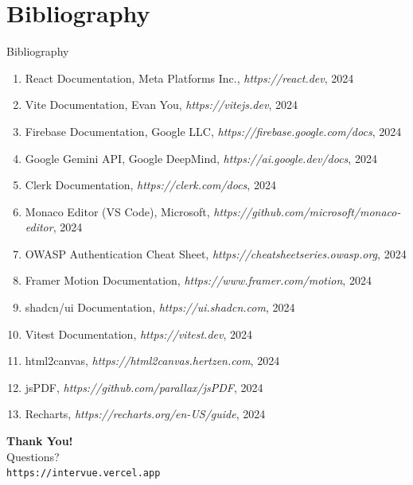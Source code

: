 \documentclass{beamer}
\begin{document}
\section{Bibliography}
\begin{frame}{Bibliography}
\footnotesize
\begin{enumerate}
    \item React Documentation, Meta Platforms Inc., \textit{https://react.dev}, 2024
    \item Vite Documentation, Evan You, \textit{https://vitejs.dev}, 2024
    \item Firebase Documentation, Google LLC, \textit{https://firebase.google.com/docs}, 2024
    \item Google Gemini API, Google DeepMind, \textit{https://ai.google.dev/docs}, 2024
    \item Clerk Documentation, \textit{https://clerk.com/docs}, 2024
    \item Monaco Editor (VS Code), Microsoft, \textit{https://github.com/microsoft/monaco-editor}, 2024
    \item OWASP Authentication Cheat Sheet, \textit{https://cheatsheetseries.owasp.org}, 2024
    \item Framer Motion Documentation, \textit{https://www.framer.com/motion}, 2024
    \item shadcn/ui Documentation, \textit{https://ui.shadcn.com}, 2024
    \item Vitest Documentation, \textit{https://vitest.dev}, 2024
    \item html2canvas, \textit{https://html2canvas.hertzen.com}, 2024
    \item jsPDF, \textit{https://github.com/parallax/jsPDF}, 2024
    \item Recharts, \textit{https://recharts.org/en-US/guide}, 2024
\end{enumerate}
\end{frame}

\begin{frame}
\begin{center}
\Huge \textbf{Thank You!}\\
\vspace{1cm}
\Large Questions?\\
\vspace{0.5cm}
\normalsize
\texttt{https://intervue.vercel.app}
\end{center}
\end{frame}
\end{document}
